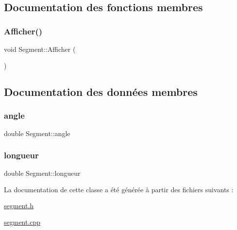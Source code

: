 \subsection{Documentation des fonctions membres}
\mbox{\label{class_segment_a1ec3ffd47a383755b4f0a51311a5c7d7}} 
\subsubsection{\texorpdfstring{Afficher()}{Afficher()}}
{\footnotesize\ttfamily void Segment\+::\+Afficher (\begin{DoxyParamCaption}{ }\end{DoxyParamCaption})}



\subsection{Documentation des données membres}
\mbox{\label{class_segment_a58f4b5a7f3c0a1038d10e778f3684b20}} 
\subsubsection{\texorpdfstring{angle}{angle}}
{\footnotesize\ttfamily double Segment\+::angle\hspace{0.3cm}{\ttfamily [private]}}

\mbox{\label{class_segment_a89584eea5e0b7c9d3fe5bcddf437f358}} 
\subsubsection{\texorpdfstring{longueur}{longueur}}
{\footnotesize\ttfamily double Segment\+::longueur\hspace{0.3cm}{\ttfamily [private]}}



La documentation de cette classe a été générée à partir des fichiers suivants \+:\begin{DoxyCompactItemize}
\item 
\hyperlink{segment_8h}{segment.\+h}\item 
\hyperlink{segment_8cpp}{segment.\+cpp}\end{DoxyCompactItemize}
